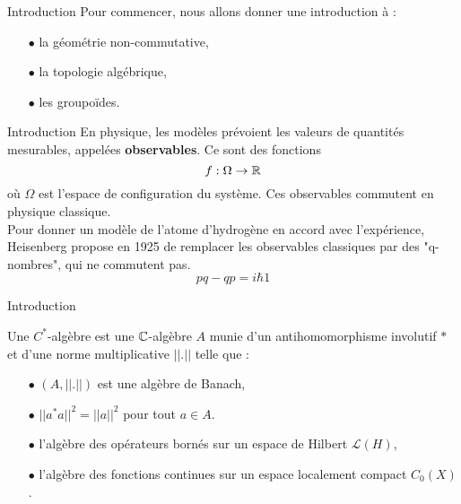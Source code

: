 \begin{frame}{Introduction}
Pour commencer, nous allons donner une introduction à :
\vspace{0.3 cm}
\begin{itemize}
\item[$\bullet$] la géométrie non-commutative,
\vspace{0.3 cm}
\item[$\bullet$] la topologie algébrique,
\vspace{0.3 cm}
\item[$\bullet$] les groupoïdes.
\end{itemize}
\end{frame}

\begin{frame}{Introduction}
En physique, les modèles prévoient les valeurs de quantités mesurables, appelées \textbf{observables}. Ce sont des fonctions
\[f:\Omega \rightarrow \mathbb R\]
où $\Omega$ est l'espace de configuration du système. Ces observables commutent en physique classique.\\
\vspace{0.3 cm} 
Pour donner un modèle de l'atome d'hydrogène en accord avec l'expérience, Heisenberg propose en 1925 de remplacer les observables classiques par des "q-nombres", qui ne commutent pas.
\[pq -qp = i\hbar 1\]
\end{frame}

\begin{frame}{Introduction}
\begin{definitionfr}
Une $C^*$-algèbre est une $\mathbb C$-algèbre $A$ munie d'un antihomomorphisme involutif $*$ et d'une norme multiplicative $||.||$ telle que :
\begin{itemize}
\item[$\bullet$] $(A,||.||)$ est une algèbre de Banach,
\item[$\bullet$] $||a^*a||^2 = ||a||^2$ pour tout $a\in A$.
\end{itemize}
\end{definitionfr}

\begin{itemize}
\item[$\bullet$] l'algèbre des opérateurs bornés sur un espace de Hilbert $\mathcal L(H)$, 
\item[$\bullet$] l'algèbre des fonctions continues sur un espace localement compact $C_0(X)$.
\end{itemize}

\end{frame}

